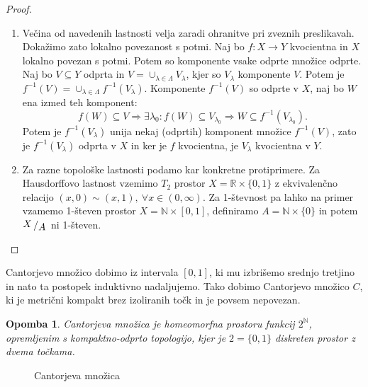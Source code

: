\documentclass[10pt, a4paper]{article}
\newtheorem*{opomba}{Opomba}
\newenvironment{noticeC}{%
  \tcolorbox[%
  notitle,
  empty,
  enhanced,  %
  breakable,
  coltext=black, 
  fontupper=\rmfamily,
  parbox=false,
  noparskip,
  sharp corners,
  boxrule=-1pt,  %
  frame hidden,
  left=7pt,  %
  right=7pt,
  top=5pt,
  bottom=5pt,
  before skip=2.5ex plus 2pt,
  after skip=2.5ex plus 2pt,
  overlay unbroken and last={%
  },
  ]}
{\endtcolorbox}
\newenvironment{dokaz}%
  {\begin{noticeC}\begin{proof}}%
  {\end{proof}\end{noticeC}}
\newcommand{\N}{\mathbb {N}}
\newcommand{\R}{\mathbb {R}}
\newcommand{\quot}[2]{{\raisebox{0.1em}{$#1$}\left/\raisebox{-0.2em}{$#2$}\right.}}
\begin{document}
\begin{dokaz}
  \begin{enumerate}
    \item Večina od navedenih lastnosti velja zaradi ohranitve pri zveznih preslikavah.
    Dokažimo zato lokalno povezanost s potmi.
    Naj bo $f: X \to Y$ kvocientna in $X$ lokalno povezan s potmi.
    Potem so komponente vsake odprte množice odprte.
    Naj bo $V \subseteq Y$ odprta in $V = \cup_{\lambda \in \Lambda} V_\lambda$,
    kjer so $V_\lambda$ komponente $V$. Potem je $f^{-1} (V) = \cup_{\lambda \in \Lambda} f^{-1} (V_\lambda)$.
    Komponente $f^{-1} (V)$ so odprte v $X$, naj bo $W$ ena izmed teh komponent:
    $$f(W) \subseteq V \Rightarrow \exists \lambda_0 : f(W) \subseteq V_{\lambda_0} \Rightarrow W \subseteq f^{-1}(V_{\lambda_0}).$$
    Potem je $f^{-1} (V_\lambda)$ unija nekaj (odprtih) komponent množice $f^{-1} (V)$, zato je 
    $f^{-1} (V_\lambda)$ odprta v $X$ in ker je $f$ kvocientna, je $V_\lambda$ kvocientna v $Y$.
    
    \item Za razne topološke lastnosti podamo kar konkretne protiprimere.
    Za Hausdorffovo lastnost vzemimo $T_2$ prostor $X = \R \times \{0, 1\}$ z ekvivalenčno 
    relacijo $(x, 0) \sim (x, 1),\ \forall x \in (0, \infty)$.
    Za 1-števnost pa lahko na primer vzamemo 1-števen prostor $X = \N \times [0, 1]$, 
    definiramo $A = \N \times \{0\}$ in potem $\quot{X}{A}$ ni 1-števen. \qedhere
  \end{enumerate}
\end{dokaz}

Cantorjevo množico dobimo iz intervala $[0, 1]$, ki mu izbrišemo srednjo tretjino in nato ta postopek 
induktivno nadaljujemo. Tako dobimo Cantorjevo množico $C$, ki je metrični kompakt brez izoliranih točk 
in je povsem nepovezan.

\begin{opomba}
  Cantorjeva množica je homeomorfna prostoru funkcij $2^{\N}$,
  opremljenim s kompaktno-odprto topologijo, kjer je $2 = \{0, 1\}$
  diskreten prostor z dvema točkama.
\end{opomba}

\begin{figure}[htb!]
  \centering 
  \caption{Cantorjeva množica}
\end{figure}
\end{document}
